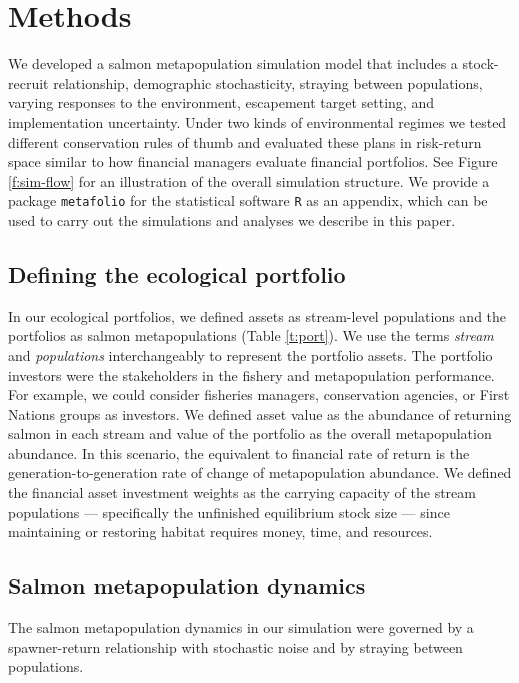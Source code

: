 \section{Methods}

We developed a salmon metapopulation simulation model that includes a
stock-recruit relationship, demographic stochasticity, straying between
populations, varying responses to the environment, escapement target
setting, and implementation uncertainty. Under two kinds of
environmental regimes we tested different conservation rules of thumb
and evaluated these plans in risk-return space similar to how financial
managers evaluate financial portfolios. See Figure \ref{f:sim-flow} for
an illustration of the overall simulation structure. We provide a
package \texttt{metafolio} for the statistical software \texttt{R}
\citep{r2013} as an appendix, which can be used to carry out the
simulations and analyses we describe in this paper.

\subsection{Defining the ecological portfolio}

In our ecological portfolios, we defined assets as stream-level
populations and the portfolios as salmon metapopulations (Table
\ref{t:port}). We use the terms \textit{stream} and \textit{populations}
interchangeably to represent the portfolio assets. The portfolio
investors were the stakeholders in the fishery and metapopulation
performance. For example, we could consider fisheries managers,
conservation agencies, or First Nations groups as investors. We defined
asset value as the abundance of returning salmon in each stream and
value of the portfolio as the overall metapopulation abundance. In this
scenario, the equivalent to financial rate of return is the
generation-to-generation rate of change of metapopulation abundance. We
defined the financial asset investment weights as the carrying capacity
of the stream populations --- specifically the unfinished equilibrium
stock size --- since maintaining or restoring habitat requires money,
time, and resources.

\subsection{Salmon metapopulation dynamics}

The salmon metapopulation dynamics in our simulation were governed by a
spawner-return relationship with stochastic noise and by straying
between populations.

